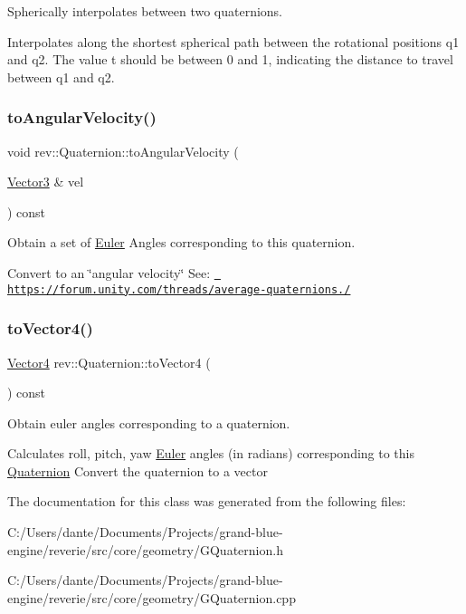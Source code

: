 Spherically interpolates between two quaternions. 

Interpolates along the shortest spherical path between the rotational positions q1 and q2. The value t should be between 0 and 1, indicating the distance to travel between q1 and q2. \mbox{\label{classrev_1_1_quaternion_ab1f505103946b69780b2b8fb9a5876fe}} 
\subsubsection{\texorpdfstring{toAngularVelocity()}{toAngularVelocity()}}
{\footnotesize\ttfamily void rev\+::\+Quaternion\+::to\+Angular\+Velocity (\begin{DoxyParamCaption}\item[{\mbox{\hyperlink{classrev_1_1_vector}{Vector3}} \&}]{vel }\end{DoxyParamCaption}) const}



Obtain a set of \mbox{\hyperlink{class_euler}{Euler}} Angles corresponding to this quaternion. 

Convert to an \char`\"{}angular velocity\char`\"{} See\+: \href{https://forum.unity.com/threads/average-quaternions.86898/}{\texttt{ https\+://forum.\+unity.\+com/threads/average-\/quaternions./}} \mbox{\label{classrev_1_1_quaternion_ab91b28cc13c12075e2017c79a7378348}} 
\subsubsection{\texorpdfstring{toVector4()}{toVector4()}}
{\footnotesize\ttfamily \mbox{\hyperlink{classrev_1_1_vector}{Vector4}} rev\+::\+Quaternion\+::to\+Vector4 (\begin{DoxyParamCaption}{ }\end{DoxyParamCaption}) const}



Obtain euler angles corresponding to a quaternion. 

Calculates roll, pitch, yaw \mbox{\hyperlink{class_euler}{Euler}} angles (in radians) corresponding to this \mbox{\hyperlink{classrev_1_1_quaternion}{Quaternion}} Convert the quaternion to a vector 

The documentation for this class was generated from the following files\+:\begin{DoxyCompactItemize}
\item 
C\+:/\+Users/dante/\+Documents/\+Projects/grand-\/blue-\/engine/reverie/src/core/geometry/G\+Quaternion.\+h\item 
C\+:/\+Users/dante/\+Documents/\+Projects/grand-\/blue-\/engine/reverie/src/core/geometry/G\+Quaternion.\+cpp\end{DoxyCompactItemize}
